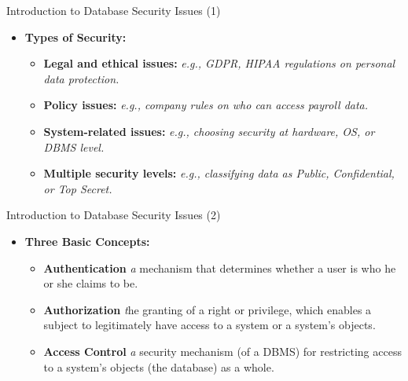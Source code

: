 
\begin{frame}{Introduction to Database Security Issues (1)}
    \Large
    
    \begin{itemize}
     \vspace{-1.5 cm}
        \item \textbf{Types of Security:}
        \vspace{0.3cm}
        
        \begin{itemize}
            \large 
            \setlength{\itemsep}{0.25cm}
            
            \item \textbf{Legal and ethical issues:} \textit{e.g., GDPR, HIPAA regulations on personal data protection.}
            
            \item \textbf{Policy issues:} \textit{e.g., company rules on who can access payroll data.}
            
            \item \textbf{System-related issues:} \textit{e.g., choosing security at hardware, OS, or DBMS level.}
            
            \item \textbf{Multiple security levels:} \textit{e.g., classifying data as Public, Confidential, or Top Secret.}
        \end{itemize}
    \end{itemize}
    
\end{frame}


\begin{frame}{Introduction to Database Security Issues (2)}
    \Large
    
    \begin{itemize}
    \vspace{-1.5 cm}
        \item \textbf{Three Basic Concepts:}
        \vspace{0.3cm}
        
        \begin{itemize}
            \large
            \setlength{\itemsep}{0.4cm}
            
            \item \textbf{Authentication} \textit a mechanism that determines whether a user is who he or she claims to be.
            
            \item \textbf{Authorization} \textit the granting of a right or privilege, which enables a subject to legitimately have access to a system or a system's objects.
            
            \item \textbf{Access Control} \textit a security mechanism (of a DBMS) for restricting access to a system's objects (the database) as a whole.
        \end{itemize}
    \end{itemize}
\end{frame}

